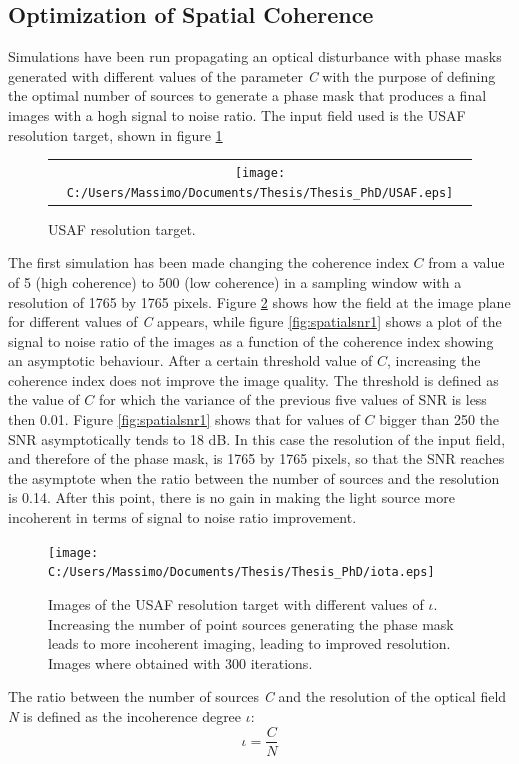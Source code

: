 \subsection{Optimization of Spatial Coherence}
Simulations have been run propagating an optical disturbance with phase masks generated with different values of the parameter \textit{C} with the purpose of defining the optimal number of sources to generate a phase mask that produces a final images with a hogh signal to noise ratio.
The input field used is the USAF resolution target, shown in figure \ref{fig:USAF}
\begin{figure}[H]
	\begin{center}
		\begin{tabular}{c}
			\texttt{[image: C:/Users/Massimo/Documents/Thesis/Thesis\_PhD/USAF.eps]}
		\end{tabular}
	\end{center}
	\caption{ \label{fig:USAF} 
		USAF resolution target. }
\end{figure} 
The first simulation has been made changing the coherence index $C$ from a value of 5 (high coherence) to 500 (low coherence) in a sampling window with a resolution of 1765 by 1765 pixels.
Figure \ref{fig:spatialsnr2} shows how the field at the image plane for different values of \textit{C} appears, while figure \ref{fig:spatialsnr1} shows a plot of the signal to noise ratio of the images as a function of the coherence index showing an asymptotic behaviour. After a certain threshold value of $C$, increasing the coherence index does not improve the image quality. The threshold is defined as the value of $C$ for which the variance of the previous five values of SNR is less then 0.01.
Figure \ref{fig:spatialsnr1} shows that for values of $C$ bigger than 250 the SNR asymptotically tends to 18 dB. In this case the resolution of the input field, and therefore of the phase mask, is 1765 by 1765 pixels, so that the SNR reaches the asymptote when the ratio between the number of sources and the resolution is 0.14. After this point, there is no gain in making the light source more incoherent in terms of signal to noise ratio improvement.
\begin{figure}[H]
	\centering
	\texttt{[image: C:/Users/Massimo/Documents/Thesis/Thesis\_PhD/iota.eps]}
	\caption{\label{fig:spatialsnr2}Images of the USAF resolution target with different values of $\iota$. Increasing the number of point sources generating the phase mask leads to more incoherent imaging, leading to improved resolution. Images where obtained with 300 iterations.}
\end{figure}
The ratio between the number of sources \textit{C} and the resolution of the optical field \textit{N} is defined as the incoherence degree $\iota$:
\begin{equation}
\label{eq:incoherence_degree}
\iota = \dfrac{C}{N}
\end{equation}
\newpage

